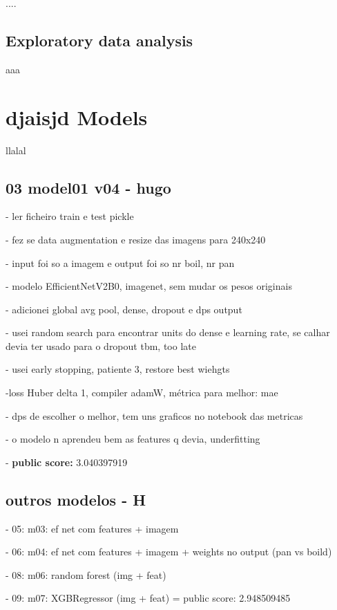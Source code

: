 \documentclass[conference]{IEEEtran}
\begin{document}
....

\subsection{Exploratory data analysis}


aaa


\section{djaisjd Models}

llalal

\subsection{03 model01 v04 - hugo}

- ler ficheiro train e test pickle

- fez se data augmentation e resize das imagens para 240x240

- input foi so a imagem e output foi so nr boil, nr pan

- modelo EfficientNetV2B0, imagenet, sem mudar os pesos originais

- adicionei global avg pool, dense, dropout e dps output

- usei random search para encontrar units do dense e learning rate, se calhar devia ter usado para o dropout tbm, too late

- usei early stopping, patiente 3, restore best wiehgts

-loss Huber delta 1, compiler adamW, métrica para melhor: mae

- dps de escolher o melhor, tem uns graficos no notebook das metricas

- o modelo n aprendeu bem as features q devia, underfitting

- \textbf{public score:} 3.040397919

\subsection{outros modelos - H}

- 05: m03: ef net com features + imagem

- 06: m04: ef net com features + imagem + weights no output (pan vs boild)

- 08: m06: random forest (img + feat)

- 09: m07: XGBRegressor (img + feat) = public score: 2.948509485
\end{document}
